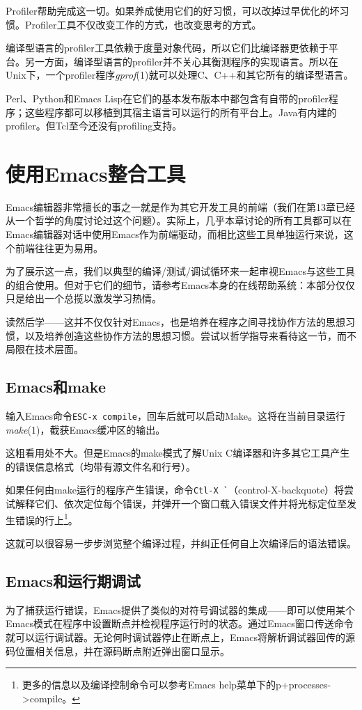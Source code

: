 \documentclass[12pt,oneside]{book}
\begin{document}
Profiler帮助完成这一切。如果养成使用它们的好习惯，可以改掉过早优化的坏习惯。Profiler工具不仅改变工作的方式，也改变思考的方式。

编译型语言的profiler工具依赖于度量对象代码，所以它们比编译器更依赖于平台。另一方面，编译型语言的profiler并不关心其衡测程序的实现语言。所以在Unix下，一个profiler程序\textit{gprof}(1)就可以处理C、C++和其它所有的编译型语言。

Perl、Python和Emacs Lisp在它们的基本发布版本中都包含有自带的profiler程序；这些程序都可以移植到其宿主语言可以运行的所有平台上。Java有内建的profiler。但Tcl至今还没有profiling支持。

\section{使用Emacs整合工具}
Emacs编辑器非常擅长的事之一就是作为其它开发工具的前端（我们在第13章已经从一个哲学的角度讨论过这个问题）。实际上，几乎本章讨论的所有工具都可以在Emacs编辑器对话中使用Emacs作为前端驱动，而相比这些工具单独运行来说，这个前端往往更为易用。

为了展示这一点，我们以典型的编译/测试/调试循环来一起审视Emacs与这些工具的组合使用。但对于它们的细节，请参考Emacs本身的在线帮助系统：本部分仅仅只是给出一个总揽以激发学习热情。

读然后学——这并不仅仅针对Emacs，也是培养在程序之间寻找协作方法的思想习惯，以及培养创造这些协作方法的思想习惯。尝试以哲学指导来看待这一节，而不局限在技术层面。


\subsection{Emacs和make}
输入Emacs命令\verb+ESC-x compile+，回车后就可以启动Make。这将在当前目录运行\textit{make}(1)，截获Emacs缓冲区的输出。

这粗看用处不大。但是Emacs的make模式了解Unix C编译器和许多其它工具产生的错误信息格式（均带有源文件名和行号）。

如果任何由make运行的程序产生错误，命令\verb+Ctl-X `+（control-X-backquote）将尝试解释它们、依次定位每个错误，并弹开一个窗口载入错误文件并将光标定位至发生错误的行上\footnote{更多的信息以及编译控制命令可以参考Emacs help菜单下的p+processes->compile。}。

这就可以很容易一步步浏览整个编译过程，并纠正任何自上次编译后的语法错误。

\subsection{Emacs和运行期调试}
为了捕获运行错误，Emacs提供了类似的对符号调试器的集成——即可以使用某个Emacs模式在程序中设置断点并检视程序运行时的状态。通过Emacs窗口传送命令就可以运行调试器。无论何时调试器停止在断点上，Emacs将解析调试器回传的源码位置相关信息，并在源码断点附近弹出窗口显示。
\end{document}

